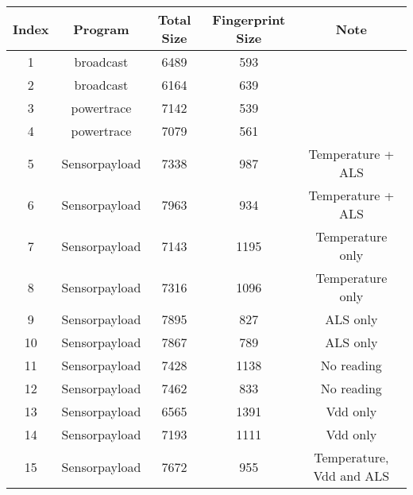 \begin{tabular}{|c|c|c|c|c|}
\hline
\textbf{Index} & \textbf{Program} & \textbf{Total Size} & \textbf{Fingerprint Size} & \textbf{Note}              \\ \hline
1                    & broadcast            & 6489          & 593                    &                            \\ \hline
2                    & broadcast            & 6164          & 639                    &                            \\ \hline
3                    & powertrace           & 7142          & 539                    &                            \\ \hline
4                    & powertrace           & 7079          & 561                    &                            \\ \hline
5                    & Sensorpayload        & 7338          & 987                    & Temperature + ALS        \\ \hline
6                    & Sensorpayload        & 7963          & 934                    & Temperature + ALS        \\ \hline
7                    & Sensorpayload        & 7143          & 1195                   & Temperature only           \\ \hline
8                    & Sensorpayload        & 7316          & 1096                   & Temperature only           \\ \hline
9                    & Sensorpayload        & 7895          & 827                    & ALS only                 \\ \hline
10                   & Sensorpayload        & 7867          & 789                    & ALS only                 \\ \hline
11                   & Sensorpayload        & 7428          & 1138                   & No reading                 \\ \hline
12                   & Sensorpayload        & 7462          & 833                    & No reading                 \\ \hline
13                   & Sensorpayload        & 6565          & 1391                   & Vdd only                   \\ \hline
14                   & Sensorpayload        & 7193          & 1111                   & Vdd only                   \\ \hline
15                   & Sensorpayload        & 7672          & 955                    & Temperature, Vdd and ALS \\ \hline

\end{tabular}
